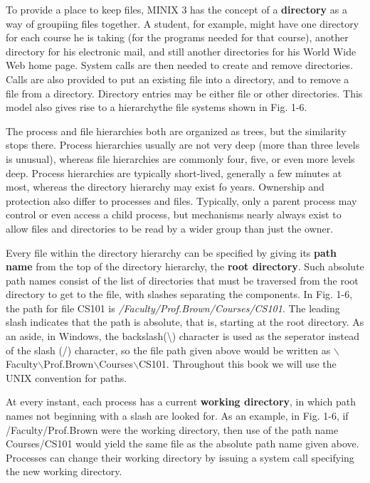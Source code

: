 \documentclass{book}
\newcommand {\kw}  [1] {\textbf{#1}}
\newcommand {\sys} [1] {\textsl{#1}}
\begin{document}
To provide a place to keep files, MINIX 3 has the concept of a \kw{directory} as a way of groupiing files together.
A student, for example, might have one directory for each course he is taking (for the programs needed for that course),
another directory for his electronic mail, and still another directories for his World Wide Web home page.
System calls are then needed to create and remove directories.
Calls are also provided to put an existing file into a directory, and to remove a file from a directory.
Directory entries may be either file or other directories.
This model also gives rise to a hierarchythe file systems shown in Fig. 1-6.

The process and file hierarchies both are organized as trees, but the similarity stops there.
Process hierarchies usually are not very deep (more than three levels is unusual), 
whereas file hierarchies are commonly four, five, or even more levels deep.
Process hierarchies are typically short-lived, generally a few minutes at most, 
whereas the directory hierarchy may exist fo years.
Ownership and protection also differ to processes and files.
Typically, only a parent process may control or even access a child process, 
but mechanisms nearly always exist to allow files and directories to be read by a wider group than just the owner.

Every file within the directory hierarchy can be specified by giving its \kw{path name} from the top of the directory hierarchy, the \kw{root directory}.
Such absolute path names consist of the list of directories that must be traversed from the root directory to get to the file, 
with slashes separating the components.
In Fig. 1-6, the path for file CS101 is \sys{/Faculty/Prof.Brown/Courses/CS101}.
The leading slash indicates that the path is absolute, that is, starting at the root directory.
As an aside, in Windows, the backslash(\textbackslash) character is used as the seperator instead of the slash (/) character, 
so the file path given above would be written as $\backslash$Faculty$\backslash$Prof.Brown$\backslash$Courses$\backslash$CS101.
Throughout this book we will use the UNIX convention for paths.

At every instant, each process has a current \kw{working directory}, in which path names not beginning with a slash are looked for.
As an example, in Fig. 1-6, if /Faculty/Prof.Brown were the working directory, 
then use of the path name Courses/CS101 would yield the same file as the absolute path name given above. 
Processes can change their working directory by issuing a system call specifying the new working directory.
\end{document}
